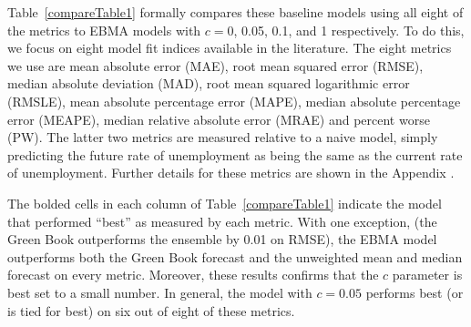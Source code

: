 \documentclass[12pt,fullpage,endnotes]{article}
\begin{document}
Table~\ref{compareTable1} formally compares these baseline models
using all eight of the metrics to EBMA models with $c=$0, 0.05, 0.1,
and 1 respectively.  To do this, we focus on eight model fit indices
available in the literature.  The eight metrics we use are mean
absolute error (MAE), root mean squared error (RMSE), median absolute
deviation (MAD), root mean squared logarithmic error (RMSLE), mean
absolute percentage error (MAPE), median absolute percentage error
(MEAPE), median relative absolute error (MRAE) and percent worse (PW).
The latter two metrics are measured relative to a naive model, simply
predicting the future rate of unemployment as being the same as the
current rate of unemployment.  Further details for these metrics are
shown in the Appendix \citep{brandt:freeman:schrodt:2011}.


The bolded cells in each column of Table~\ref{compareTable1} indicate
the model that performed ``best'' as measured by each metric.  With
one exception, (the Green Book outperforms the ensemble by 0.01 on
RMSE), the EBMA model outperforms both the Green Book forecast and the
unweighted mean and median forecast on every metric.  Moreover, these
results confirms that the $c$ parameter is best set to a small number.
In general, the model with $c=0.05$ performs best (or is tied for
best) on six out of eight of these metrics.





\end{document}
